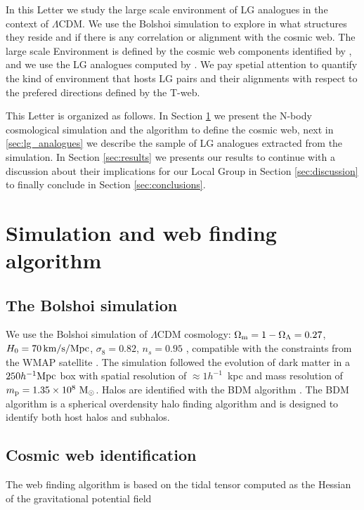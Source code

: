 \documentclass{emulateapj}
\newcommand{\hmpc}{{\ifmmode{h^{-1}{\rm Mpc}}\else{$h^{-1}$Mpc }\fi}}
\begin{document}
In this Letter we study the large scale environment of LG 
analogues in the context of $\Lambda$CDM. We use the Bolshoi
simulation to explore in what structures they reside and if there is
any correlation or alignment with the cosmic web. The large scale
Environment is defined by the cosmic web components identified by
\citet{Tweb}, and we use the LG analogues computed by
\citet{lganalogues}. We pay spetial attention to quantify the kind of
environment that hosts LG pairs and their alignments with respect to
the prefered directions defined by the T-web. 
   
This Letter is organized as follows. In Section \ref{sec:simulation}
we present the N-body cosmological simulation and the algorithm to
define the cosmic web, next in \ref{sec:lg_analogues} we describe the
sample of LG analogues extracted from the simulation. In
Section \ref{sec:results} we presents our results to continue with a
discussion about their implications for our Local Group in Section
\ref{sec:discussion} to finally conclude in Section
\ref{sec:conclusions}. 


\section{Simulation and web finding algorithm}
\label{sec:simulation}

\subsection{The Bolshoi simulation}
We use the Bolshoi simulation of $\Lambda$CDM cosmology: $\Omega_{\rm
  m}=1-\Omega_{\Lambda}=0.27$, $H_0=70\,\rm km/s/Mpc$,
$\sigma_8=0.82$, $n_s=0.95$ \citep{2011ApJ...740..102K}, compatible
with the constraints from the WMAP satellite
\citep{hinshaw_etal13}. The simulation followed the evolution of dark
matter in a $250 \hmpc$ box with spatial resolution of $\approx
1h^{-1}$~kpc and mass resolution of $m_{\rm p}=1.35\times 10^8\ \rm
M_{\odot}$. Halos are identified with the BDM algorithm
\citep{1997astro.ph.12217K}. The BDM algorithm is  a spherical
overdensity halo finding algorithm and is designed to identify both
host halos and subhalos. 


\subsection{Cosmic web identification}
The web finding algorithm is based on the tidal tensor computed as the
Hessian of the  gravitational potential field
\end{document}
